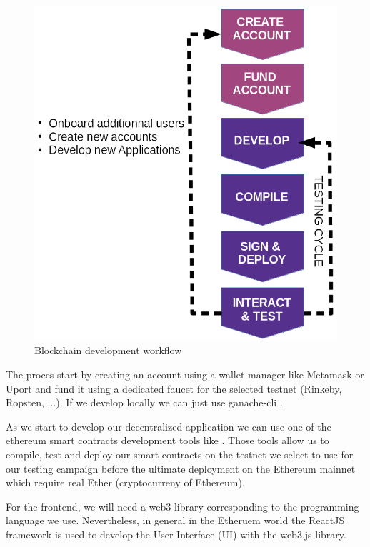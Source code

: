 \documentclass{isprs} %
\begin{document}
\begin{figure}[ht!]
\begin{center}
		\includegraphics[width=1.0\columnwidth]{figures/eth-dev-process.png}
	\caption{Blockchain development workflow}
\label{fig:figure_dev_workflow}
\end{center}
\end{figure}
  
The proces start by creating an account using a wallet manager like Metamask \cite{metamask} or Uport \cite{uport} and fund it using a dedicated faucet for the selected testnet (Rinkeby, Ropsten, ...). If we develop locally we can just use ganache-cli \cite{truffle}.

As we start to develop our decentralized application we can use one of the ethereum smart contracts development tools like \cite{truffle}. Those tools allow us to compile, test and deploy our smart contracts on the testnet we select to use for our testing campaign before the ultimate deployment on the Ethereum mainnet which require real Ether (cryptocurreny of Ethereum).

For the frontend, we will need a web3 library corresponding to the programming language we use. Nevertheless, in general in the Etheruem world the ReactJS \cite{reactjs} framework is used to develop the User Interface (UI) with the web3.js \cite{web3_js} library.
\end{document}
